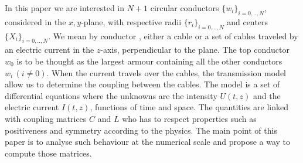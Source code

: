 In this paper we are interested in  $N+1$ circular conductors
$\{w_i\}_{i=0,..,N}$, considered in the $x,y$-plane, with respective radii
$\{r_i\}_{i=0,..,N}$ and centers $\{X_i\}_{i=0,..,N}$. We mean by conductor
 , either a cable or a set of cables traveled by an electric
 current in the $z$-axis, perpendicular to the plane. The
top conductor $w_0$ is to be thought as the largest armour containing all the
other conductors $w_i \, (i \ne 0)$. When the current travels over the cables,
the transmission model allow us to determine the coupling between the cables.
The model is a set of differential equations where the unknowns are the
intensity $U(t,z)$ and the electric current $I(t,z)$, functions of time and
space. The quantities are linked with coupling matrices $C$ and $L$ who has to
respect properties such as positiveness and symmetry according to the physics.
The main point of this paper is to analyse such behaviour at the numerical
scale and propose a way to compute those matrices. 


